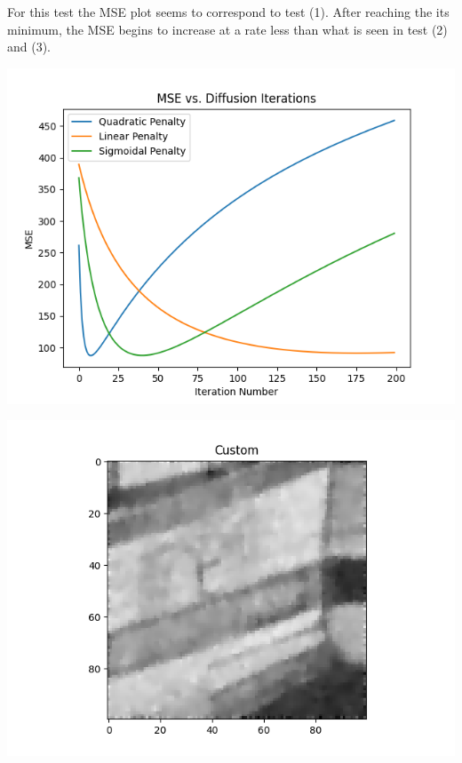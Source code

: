 \documentclass{article}
\begin{document}
  \noindent For this test the MSE plot seems to correspond to
  test (1). After reaching the its minimum, the MSE begins to
  increase at a rate less than what is seen in test (2) and (3).
  \begin{center}
    \includegraphics[scale=0.5]{../generated_images/MSE_test4.png}\\
  \end{center}
  \begin{center}
    \includegraphics[scale=0.5]{../generated_images/Custom_test4.png}\\
  \end{center}
\end{document}

